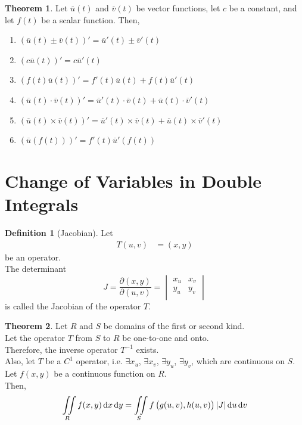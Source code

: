 \documentclass[fleqn, a4paper, 8pt, twoside]{amsart}
\theoremstyle{definition}
\theoremstyle{bluedefinition}
\newtheorem{definition}{Definition}
\theoremstyle{redtheorem}
\newtheorem{theorem}{Theorem}
\begin{document}
\begin{multicols}{2}
\begin{spacing}{0.7}
\begin{theorem}
	Let $\overline{u}(t)$ and $\overline{v}(t)$ be vector functions, let $c$ be a constant, and let $f(t)$ be a scalar function.
	Then,
	\begin{enumerate}
		\item $\left( \overline{u}(t) \pm \overline{v}(t) \right)' = \overline{u}'(t) \pm \overline{v}'(t)$
		\item $\left( c \overline{u}(t) \right)' = c \overline{u}'(t)$
		\item $\left( f(t) \overline{u}(t) \right)' = f'(t) \overline{u}(t) + f(t) \overline{u}'(t)$
		\item $\left( \overline{u}(t) \cdot \overline{v}(t) \right)' = \overline{u}'(t) \cdot \overline{v}(t) + \overline{u}(t) \cdot \overline{v}'(t)$
		\item $\left( \overline{u}(t) \times \overline{v}(t) \right)' = \overline{u}'(t) \times \overline{v}(t) + \overline{u}(t) \times \overline{v}'(t)$
		\item $\left( \overline{u}\left( f(t) \right) \right)' = f'(t) \overline{u}'\left( f(t) \right)$
	\end{enumerate}
\end{theorem}

\section{Change of Variables in Double Integrals}

\begin{definition}[Jacobian]
	Let
	\begin{align*}
		T(u,v) & = (x,y)
	\end{align*}
	be an operator.\\
	The determinant
	\begin{equation*}
		J = \frac{\partial(x,y)}{\partial(u,v)} =
			\begin{vmatrix}
				x_u & x_v \\
				y_u & y_v \\
			\end{vmatrix}
	\end{equation*}
	is called the Jacobian of the operator $T$.
\end{definition}

\begin{theorem}
	Let $R$ and $S$ be domains of the first or second kind.\\
	Let the operator $T$ from $S$ to $R$ be one-to-one and onto.\\
	Therefore, the inverse operator $T^{-1}$ exists.\\
	Also, let $T$ be a $C^1$ operator, i.e. $\exists x_u$, $\exists x_v$, $\exists y_u$, $\exists y_v$, which are continuous on $S$.\\
	Let $f(x,y)$ be a continuous function on $R$.\\
	Then,
	\begin{equation*}
		\iint\limits_{R} f(x,y) \dif x \dif y = \iint\limits_{S} f\left( g(u,v), h(u,v) \right) |J| \dif u \dif v
	\end{equation*}
\end{theorem}


\end{spacing}
\end{multicols}
\end{document}
